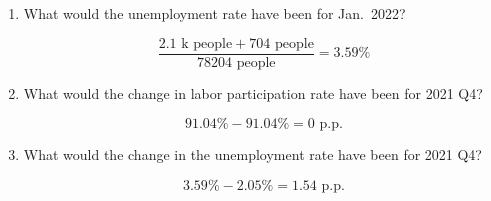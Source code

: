 \documentclass{assignment}
\begin{document}
\begin{enumerate}
\begin{enumerate}
\item What would the unemployment rate have been for Jan.~2022?

\begin{solution}
$$\frac{2.1 \text{~k people} + 704 \text{~people}}{78204 \text{~people}} = 3.59\%$$
\end{solution}

\item What would the change in labor participation rate have been for 2021 Q4?

\begin{solution}
$$91.04\% - 91.04\% = 0 \text{~p.p.}$$
\end{solution}

\item What would the change in the unemployment rate have been for 2021 Q4?

\begin{solution}
$$3.59\% - 2.05\% = 1.54 \text{~p.p.}$$
\end{solution}

\end{enumerate}
\end{enumerate}
\end{document}
